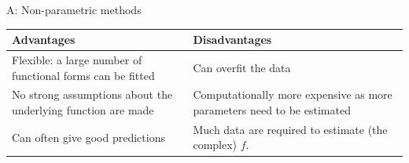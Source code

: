 \documentclass[ignorenonframetext,]{beamer}
\begin{document}
\begin{frame}

\begin{block}{A: Non-parametric methods}

\begin{longtable}[]{@{}ll@{}}
\toprule
\begin{minipage}[b]{0.47\columnwidth}\raggedright\strut
Advantages\strut
\end{minipage} & \begin{minipage}[b]{0.47\columnwidth}\raggedright\strut
Disadvantages\strut
\end{minipage}\tabularnewline
\midrule
\endhead
\begin{minipage}[t]{0.47\columnwidth}\raggedright\strut
Flexible: a large number of functional forms can be fitted\strut
\end{minipage} & \begin{minipage}[t]{0.47\columnwidth}\raggedright\strut
Can overfit the data\vspace{2mm}\strut
\end{minipage}\tabularnewline
\begin{minipage}[t]{0.47\columnwidth}\raggedright\strut
No strong assumptions about the underlying function are made\strut
\end{minipage} & \begin{minipage}[t]{0.47\columnwidth}\raggedright\strut
Computationally more expensive as more parameters need to be
estimated\vspace{2mm}\strut
\end{minipage}\tabularnewline
\begin{minipage}[t]{0.47\columnwidth}\raggedright\strut
Can often give good predictions\strut
\end{minipage} & \begin{minipage}[t]{0.47\columnwidth}\raggedright\strut
Much data are required to estimate (the complex) \(f\).\strut
\end{minipage}\tabularnewline
\bottomrule
\end{longtable}

\end{block}

\end{frame}
\end{document}
